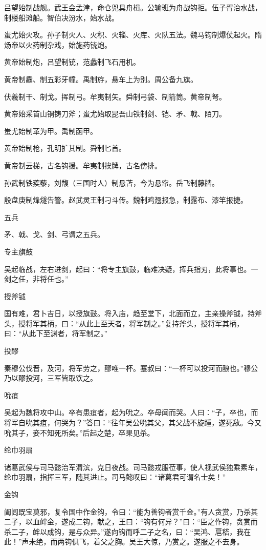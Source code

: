 \documentclass[a4paper,12pt,UTF8,twoside]{ctexbook}
\begin{document}
    吕望始制战舰。武王会孟津，命仓兕具舟楫。公输班为舟战钩拒。伍子胥治水战，制楼船滩船。智伯决汾水，始水战。
    
    蚩尤始火攻。孙子制火人、火积、火辎、火库、火队五法。魏马钧制爆仗起火。隋炀帝以火药制杂戏，始施药铳炮。
    
    黄帝始制炮，吕望制铳，范蠡制飞石用机。
    
    黄帝制纛、制五彩牙幢。禹制斿，悬车上为别。周公备九旗。
    
    伏羲制干、制戈。挥制弓。牟夷制矢。舜制弓袋、制箭筒。黄帝制弩。
    
    黄帝始采首山铜铸刀斧；蚩尤始取昆吾山铁制剑、铠、矛、戟、陌刀。
    
    蚩尤始制革为甲。禹制函甲。
    
    黄帝始制枪，孔明扩其制。舜制匕首。
    
    黄帝制云梯，古名钩援。牟夷制挨牌，古名傍排。
    
    孙武制铁蒺藜，刘馥（三国时人）制悬苫，今为悬帘。岳飞制藤牌。
    
    殷盘庚制烽燧告警。赵武灵王制刁斗传。魏制鸡翘报急，制露布、漆竿报捷。
    
    五兵
    
    矛、戟、戈、剑、弓谓之五兵。
    
    专主旗鼓
    
    吴起临战，左右进剑，起曰：“将专主旗鼓，临难决疑，挥兵指刃，此将事也。一剑之任，非将任也。”
    
    授斧钺
    
    国有难，君卜吉日，以授旗鼓。将入庙，趋至堂下，北面而立，主亲操斧钺，持斧头，授将军其柄，曰：“从此上至天者，将军制之。”复持斧头，授将军其柄，曰：“从此下至渊者，将军制之。”
    
    投醪
    
    秦穆公伐晋，及河，将军劳之，醪唯一杯。蹇叔曰：“一杯可以投河而酿也。”穆公乃以醪投河，三军皆取饮之。
    
    吮疽
    
    吴起为魏将攻中山。卒有患疽者，起为吮之。卒母闻而哭。人曰：“子，卒也，而将军自吮其疽，何哭为？”答曰：“往年吴公吮其父，其父战不旋踵，遂死敌。今又吮其子，妾不知死所矣。”后起之楚，卒果见杀。
    
    纶巾羽扇
    
    诸葛武侯与司马懿治军渭滨，克日夜战。司马懿戎服莅事，使人视武侯独乘素车，纶巾羽扇，指挥三军，随其进止。司马懿叹曰：“诸葛君可谓名士矣！”
    
    金钩
    
    阖闾既宝莫邪，复令国中作金钩，令曰：“能为善钩者赏千金。”有人贪赏，乃杀其二子，以血衅金，遂成二钩，献之，王曰：“钩有何异？”曰：“臣之作钩，贪赏而杀二子，衅以成钩，是与众异。”遂向钩而呼二子之名，曰：“吴鸿、扈嵇，我在此！”声未绝，而两钩俱飞，着父之胸。吴王大惊，乃赏之。遂服之不去身。
    
\end{document}
